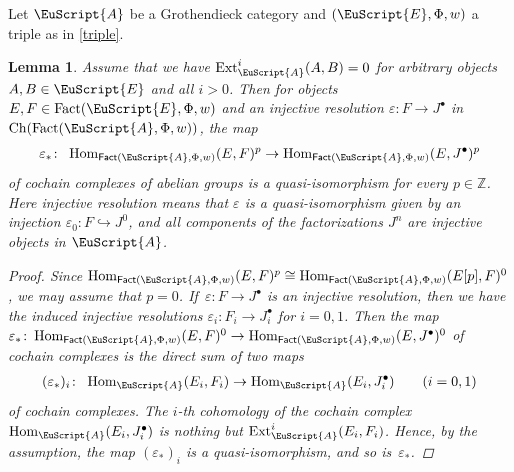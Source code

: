 \documentclass[10pt,a4paper]{amsart}
\newtheorem{lem}[dfn]{Lemma}
\numberwithin{equation}{section}
\newcommand{\Ch}{\operatorname{Ch}}
\newcommand{\Fact}{\operatorname{Fact}}
\newcommand{\dgFact}{\operatorname{\sf{Fact}}}
\newcommand{\Hom}{\operatorname{Hom}}
\newcommand{\Ext}{\operatorname{Ext}}
\newcommand{\bZ}{\mathbb{Z}}
\newcommand{\scrA}{\EuScript{A}}
\newcommand{\scrE}{\EuScript{E}}
\newcommand{\hookto}{\hookrightarrow}
\begin{document}
Let $\scrA$ be a Grothendieck category and $(\scrE,\Phi,w)$ a triple as in \eqref{triple}.
\begin{lem}\label{qis}
Assume that we have $\Ext^i_{\scrA}(A,B)=0$ for arbitrary objects $A,B\in \scrE$ and all $i>0$. Then for objects $E,F\in \Fact(\scrE,\Phi,w)$ and an injective resolution $\varepsilon\colon F\to J^{\bullet}$ in $\Ch(\Fact(\scrA,\Phi,w))$, the map
\begin{gather*}
\varepsilon_*\colon\ \Hom_{\dgFact(\scrA,\Phi,w)}(E,F)^p\to\Hom_{\dgFact(\scrA,\Phi,w)}(E,J^{\bullet})^p
\end{gather*}
of cochain complexes of abelian groups is a quasi-isomorphism for every $p\in \bZ$. Here injective resolution means that $\varepsilon$ is a quasi-isomorphism given by an injection $\varepsilon_0\colon F\hookto J^0$, and all components of the factorizations $J^n$ are injective objects in $\scrA$.

\begin{proof}
Since $\Hom_{\dgFact(\scrA,\Phi,w)}(E,F)^p\cong \Hom_{\dgFact(\scrA,\Phi,w)}(E[p],F)^0$, we may assume that $p=0$. If~$\varepsilon\colon F\to J^{\bullet}$ is an injective resolution, then we have the induced injective resolutions $\varepsilon_i\colon F_i\to J^{\bullet}_i$ for $i=0,1$.
Then the map $\varepsilon_*\colon \Hom_{\dgFact(\scrA,\Phi,w)}(E,F)^0\to\Hom_{\dgFact(\scrA,\Phi,w)}(E,J^{\bullet})^0$ of cochain complexes is the direct sum of two maps
\begin{gather*}
(\varepsilon_*)_i\colon\ \Hom_{\scrA}(E_i,F_i)\to \Hom_{\scrA}(E_i,J^{\bullet}_i)\qquad (i=0,1)
\end{gather*}
of cochain complexes. The $i$-th cohomology of the cochain complex $\Hom_{\scrA}(E_i,J^{\bullet}_i)$ is nothing but $\Ext^i_{\scrA}(E_i,F_i)$. Hence, by the assumption, the map $(\varepsilon_*)_i$ is a quasi-isomorphism, and so is~$\varepsilon_*$.
\end{proof}
\end{lem}
\end{document}
